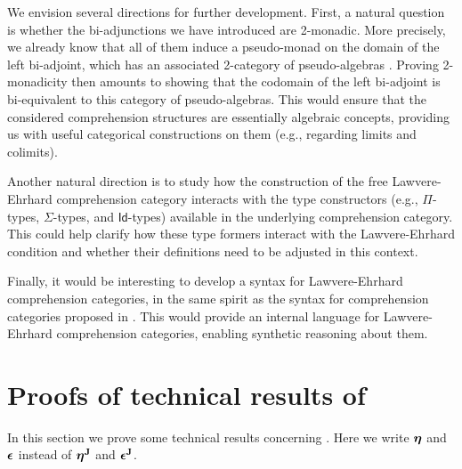 \documentclass{lmcs} %
\theoremstyle{plain}\newtheorem{satz}[thm]{Satz} %
\begin{document}
We envision several directions for further development.
First, a natural question is whether the bi-adjunctions we have introduced are 2-monadic. More precisely, we already know that all of them induce a pseudo-monad on the domain of the left bi-adjoint, which has an associated 2-category of pseudo-algebras \cite{blackwell1989two}. Proving 2-monadicity then amounts to showing that the codomain of the left bi-adjoint is bi-equivalent to this category of pseudo-algebras. This would ensure that the considered comprehension structures are essentially algebraic concepts, providing us with useful categorical constructions on them (e.g., regarding limits and colimits).

Another natural direction is to study how the construction of the free Lawvere-Ehrhard comprehension category interacts with the type constructors (e.g., $\Pi$-types, $\Sigma$-types, and $\mathsf{Id}$-types) available in the underlying comprehension category. This could help clarify how these type formers interact with the Lawvere-Ehrhard condition and whether their definitions need to be adjusted in this context.

Finally, it would be interesting to develop a syntax for Lawvere-Ehrhard comprehension categories, in the same spirit as the syntax for comprehension categories proposed in \cite{najmaei2026semantics}. This would provide an internal language for Lawvere-Ehrhard comprehension categories, enabling synthetic reasoning about them.





 







\appendix
\section{Proofs of technical results of }\label{app:A}
In this section we prove some technical results concerning .
Here we write $\boldsymbol{\eta}$ and $\boldsymbol{\epsilon}$ instead of $\boldsymbol{\eta}^{\mathbf{J}}_{}$ and $\boldsymbol{\epsilon}^{\mathbf{J}}_{}$.
\end{document}
